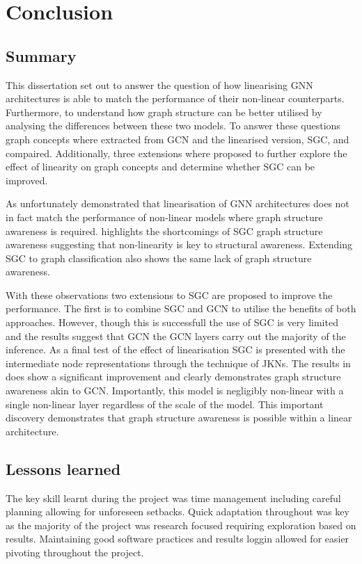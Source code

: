 \chapter{Conclusion}

\section{Summary}
This dissertation set out to answer the question of how linearising GNN architectures is able to match the performance of their non-linear counterparts.
Furthermore, to understand how graph structure can be better utilised by analysing the differences between these two models.
To answer these questions graph concepts where extracted from GCN and the linearised version, SGC, and compaired.
Additionally, three extensions where proposed to further explore the effect of linearity on graph concepts and determine whether SGC can be improved.

As  unfortunately demonstrated that linearisation of GNN architectures does not in fact match the performance of non-linear models where graph structure awareness is required.
 highlights the shortcomings of SGC graph structure awareness suggesting that non-linearity is key to structural awareness.
Extending SGC to graph classification also shows the same lack of graph structure awareness.

With these observations two extensions to SGC are proposed to improve the performance.
The first is to combine SGC and GCN to utilise the benefits of both approaches.
However, though this is successfull the use of SGC is very limited and the results suggest that GCN the GCN layers carry out the majority of the inference.
As a final test of the effect of linearisation SGC is presented with the intermediate node representations through the technique of JKNs.
The results in  does show a significant improvement and clearly demonstrates graph structure awareness akin to GCN.
Importantly, this model is negligibly non-linear with a single non-linear layer regardless of the scale of the model.
This important discovery demonstrates that graph structure awareness is possible within a linear architecture.

\section{Lessons learned}
The key skill learnt during the project was time management including careful planning allowing for unforeseen setbacks.
Quick adaptation throughout was key as the majority of the project was research focused requiring exploration based on results.
Maintaining good software practices and results loggin allowed for easier pivoting throughout the project.

